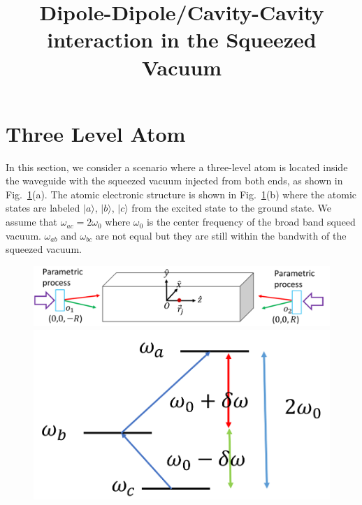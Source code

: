 \documentclass{article}
\begin{document}
\title{Dipole-Dipole/Cavity-Cavity interaction in the Squeezed Vacuum}
\maketitle 




\section{Three Level Atom}
In this section, we consider a scenario where a three-level atom is located inside the waveguide with the squeezed vacuum injected from both ends, as shown in Fig.~\ref{1}(a). The atomic electronic structure is shown in Fig.~\ref{1}(b) where the atomic states are labeled $|a\rangle$, $|b\rangle$, $|c\rangle$ from the excited state to the ground state. We assume that $\omega_{ac}=2\omega_0$ where $\omega_0$ is the center frequency of the broad band squeed vacuum. $\omega_{ab}$ and $\omega_{bc}$ are not equal but they are still within the bandwith of the squeezed vacuum.  
\begin{figure}
\includegraphics[width=0.7\columnwidth]{fig1.png}
\includegraphics[width=0.25\columnwidth]{fig2.png}
\caption{}
\label{1}
\end{figure}
\end{document}
